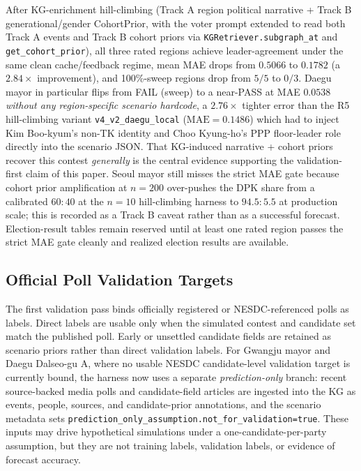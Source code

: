 \documentclass[11pt]{article}
\begin{document}
After KG-enrichment hill-climbing (Track A region political narrative + Track B generational/gender CohortPrior, with the voter prompt extended to read both Track A events and Track B cohort priors via \texttt{KGRetriever.subgraph\_at} and \texttt{get\_cohort\_prior}), all three rated regions achieve leader-agreement under the same clean cache/feedback regime, mean MAE drops from $0.5066$ to $0.1782$ (a $2.84\times$ improvement), and 100\%-sweep regions drop from $5/5$ to $0/3$. Daegu mayor in particular flips from FAIL (sweep) to a near-PASS at MAE $0.0538$ \emph{without any region-specific scenario hardcode}, a $2.76\times$ tighter error than the R5 hill-climbing variant \texttt{v4\_v2\_daegu\_local} ($\text{MAE}=0.1486$) which had to inject Kim Boo-kyum's non-TK identity and Choo Kyung-ho's PPP floor-leader role directly into the scenario JSON. That KG-induced narrative + cohort priors recover this contest \emph{generally} is the central evidence supporting the validation-first claim of this paper. Seoul mayor still misses the strict MAE gate because cohort prior amplification at $n{=}200$ over-pushes the DPK share from a calibrated $60{:}40$ at the $n{=}10$ hill-climbing harness to $94.5{:}5.5$ at production scale; this is recorded as a Track B caveat rather than as a successful forecast. Election-result tables remain reserved until at least one rated region passes the strict MAE gate cleanly and realized election results are available.

\subsection{Official Poll Validation Targets}

The first validation pass binds officially registered or NESDC-referenced polls as labels. Direct labels are usable only when the simulated contest and candidate set match the published poll. Early or unsettled candidate fields are retained as scenario priors rather than direct validation labels. For Gwangju mayor and Daegu Dalseo-gu A, where no usable NESDC candidate-level validation target is currently bound, the harness now uses a separate \emph{prediction-only} branch: recent source-backed media polls and candidate-field articles are ingested into the KG as events, people, sources, and candidate-prior annotations, and the scenario metadata sets \texttt{prediction\_only\_assumption.not\_for\_validation=true}. These inputs may drive hypothetical simulations under a one-candidate-per-party assumption, but they are not training labels, validation labels, or evidence of forecast accuracy.
\end{document}
